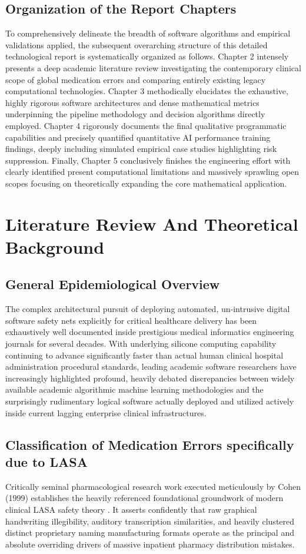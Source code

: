 \documentclass[12pt,a4paper]{report}
\begin{document}
\section{Organization of the Report Chapters}
To comprehensively delineate the breadth of software algorithms and empirical validations applied, the subsequent overarching structure of this detailed technological report is systematically organized as follows. Chapter 2 intensely presents a deep academic literature review investigating the contemporary clinical scope of global medication errors and comparing entirely existing legacy computational technologies. Chapter 3 methodically elucidates the exhaustive, highly rigorous software architectures and dense mathematical metrics underpinning the pipeline methodology and decision algorithms directly employed. Chapter 4 rigorously documents the final qualitative programmatic capabilities and precisely quantified quantitative AI performance training findings, deeply including simulated empirical case studies highlighting risk suppression. Finally, Chapter 5 conclusively finishes the engineering effort with clearly identified present computational limitations and massively sprawling open scopes focusing on theoretically expanding the core mathematical application.

\chapter{Literature Review And Theoretical Background}

\section{General Epidemiological Overview}
The complex architectural pursuit of deploying automated, un-intrusive digital software safety nets explicitly for critical healthcare delivery has been exhaustively well documented inside prestigious medical informatics engineering journals for several decades. With underlying silicone computing capability continuing to advance significantly faster than actual human clinical hospital administration procedural standards, leading academic software researchers have increasingly highlighted profound, heavily debated discrepancies between widely available academic algorithmic machine learning methodologies and the surprisingly rudimentary logical software actually deployed and utilized actively inside current lagging enterprise clinical infrastructures.

\section{Classification of Medication Errors specifically due to LASA}
Critically seminal pharmacological research work executed meticulously by Cohen (1999) establishes the heavily referenced foundational groundwork of modern clinical LASA safety theory \cite{cohen1999}. It asserts confidently that raw graphical handwriting illegibility, auditory transcription similarities, and heavily clustered distinct proprietary naming manufacturing formats operate as the principal and absolute overriding drivers of massive inpatient pharmacy distribution mistakes.
\end{document}
